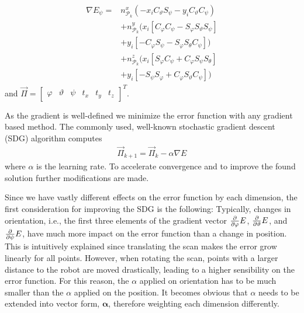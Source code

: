 \begin{align}
\begin{split}
	\nabla E_\psi = &n_{\mathcal{P}_k}^x\left(-x_iC_\vartheta S_\psi - y_iC_\vartheta C_\psi\right) \\
       &+ n_{\mathcal{P}_k}^y(x_i[C_\varphi C_\psi - S_\varphi S_\vartheta S_\psi]\\
       &+ y_i[-C_\varphi S_\psi - S_\varphi S_\theta C_\psi]) \\
       &+ n_{\mathcal{P}_k}^z(x_i[S_\varphi C_\psi + C_\varphi S_\psi S_\theta] \\
       &+ y_i[-S_\psi S_ \varphi + C_\varphi S_\vartheta C_\psi]) 
\end{split}
\end{align}
and $\vec{\Pi}=\begin{bmatrix}\varphi & \vartheta & \psi & t_x & t_y & t_z\end{bmatrix}^T$.

As the gradient is well-defined we minimize the error function with any gradient based method. 
The commonly used, well-known stochastic gradient descent (SDG) algorithm computes 
\begin{align}
    \vec{\Pi}_{k+1} = \vec{\Pi}_{k} - \alpha \nabla E
\end{align}
where $\alpha$ is the learning rate.
To accelerate convergence and to improve the found solution further modifications are made.

Since we have vastly different effects on the error function by each dimension, the first consideration for improving the SDG is the following:
Typically, changes in orientation, i.e., the first three elements of the gradient vector $\frac{\partial}{\partial \varphi}E$, $\frac{\partial}{\partial \vartheta}E$, and $\frac{\partial}{\partial \psi}E$, have much more impact on the error function than a change in position.
This is intuitively explained since translating the scan makes the error grow linearly for all points.
However, when rotating the scan, points with a larger distance to the robot are moved drastically, leading to a higher sensibility on the error function.
For this reason, the $\alpha$ applied on orientation has to be much smaller than the $\alpha$ applied on the position.
It becomes obvious that $\alpha$ needs to be extended into vector form, $\boldsymbol\alpha$, therefore weighting each dimension differently.

